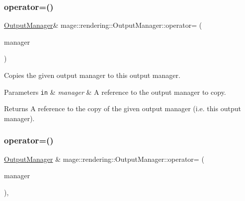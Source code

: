 \subsubsection{\texorpdfstring{operator=()}{operator=()}\hspace{0.1cm}{\footnotesize\ttfamily [1/2]}}
{\footnotesize\ttfamily \hyperlink{classmage_1_1rendering_1_1_output_manager}{Output\+Manager}\& mage\+::rendering\+::\+Output\+Manager\+::operator= (\begin{DoxyParamCaption}\item[{const \hyperlink{classmage_1_1rendering_1_1_output_manager}{Output\+Manager} \&}]{manager }\end{DoxyParamCaption})\hspace{0.3cm}{\ttfamily [delete]}}

Copies the given output manager to this output manager.


\begin{DoxyParams}[1]{Parameters}
\mbox{\tt in}  & {\em manager} & A reference to the output manager to copy. \\
\hline
\end{DoxyParams}
\begin{DoxyReturn}{Returns}
A reference to the copy of the given output manager (i.\+e. this output manager). 
\end{DoxyReturn}
\hypertarget{classmage_1_1rendering_1_1_output_manager_a97d2c2be4389a615eb084dd53af531aa}{}\label{classmage_1_1rendering_1_1_output_manager_a97d2c2be4389a615eb084dd53af531aa} 
\subsubsection{\texorpdfstring{operator=()}{operator=()}\hspace{0.1cm}{\footnotesize\ttfamily [2/2]}}
{\footnotesize\ttfamily \hyperlink{classmage_1_1rendering_1_1_output_manager}{Output\+Manager} \& mage\+::rendering\+::\+Output\+Manager\+::operator= (\begin{DoxyParamCaption}\item[{\hyperlink{classmage_1_1rendering_1_1_output_manager}{Output\+Manager} \&\&}]{manager }\end{DoxyParamCaption})\hspace{0.3cm}{\ttfamily [default]}, {\ttfamily [noexcept]}}

